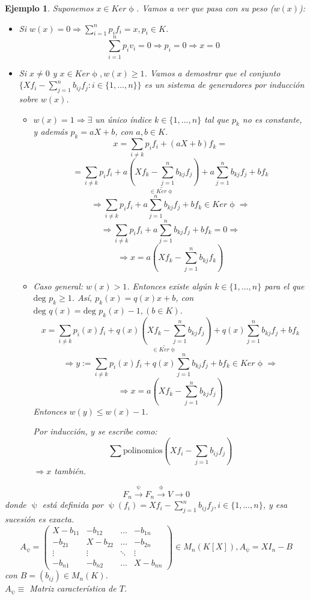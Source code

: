 \documentclass[11pt,a4paper]{article}
\theoremstyle{break}
\newtheorem{example}[theorem]{Ejemplo}
\begin{document}
\begin{example}
Suponemos $x \in Ker \upphi$. Vamos a ver que pasa con su peso ($w(x)$):
\begin{itemize}
\item Si $w(x) = 0 \Rightarrow \sum\limits_{i=1}^{n} p_{i} f_{i} = x, p_{i} \in K$.
$$\sum_{i=1}^{n} p_{i} v_{i} = 0 \Rightarrow p_{i} = 0 \Rightarrow x = 0$$
\item Si $x \neq 0$ y $x \in Ker \upphi, w(x) \geq 1$. Vamos a demostrar que el conjunto $\{Xf_{i} - \sum\limits_{j=1}^{n} b_{ij}f_{j}: i \in \{1, \dots, n\}\}$ es un sistema de generadores por inducción sobre $w(x)$.
\begin{itemize}
\item $w(x) = 1 \Rightarrow \exists$ un único índice $k \in \{1, \dots, n\}$ tal que $p_{k}$ no es constante, y además $p_{k} = aX + b$, con $a, b \in K$.
$$x = \sum_{i \neq k} p_{i} f_{i} + (aX + b)f_{k} = $$
$$= \sum_{i \neq k} p_{i}f_{i} + \underset{\in Ker \upphi}{\underline{a(X f_{k} - \sum_{j=1}^{n} b_{kj}f_{j})}} + a\sum_{j=1}^{n} b_{kj}f_{j} + bf_{k}$$
$$\Rightarrow \sum_{i \neq k} p_{i} f_{i} + a \sum_{j=1}^{n} b_{kj} f_{j} + bf_{k} \in Ker \upphi \Rightarrow$$
$$\Rightarrow \sum_{i \neq k} p_{i} f_{i} + a \sum_{j=1}^{n} b_{kj} f_{j} + bf_{k} = 0 \Rightarrow$$
$$\Rightarrow x = a(X f_{k} - \sum_{j=1}^{n} b_{kj}f_{k})$$
\item Caso general: $w(x) > 1$. Entonces existe algún $k \in \{1, \dots, n\}$ para el que $\text{deg } p_{k} \geq 1$. Así, $p_{k}(x) = q(x)x + b$, con $\text{deg } q(x) = \text{deg } p_{k}(x) - 1, (b \in K)$.
$$x = \sum_{i \neq k} p_{i}(x)f_{i} + \underset{\in Ker \upphi}{\underline{q(x) (Xf_{k} - \sum_{j=1}^{n} b_{kj} f_{j})}} + q(x) \sum_{j = 1}^{n} b_{kj} f_{j} + bf_{k}$$
$$\Rightarrow y := \sum_{i \neq k} p_{i}(x) f_{i} + q(x)\sum_{j=1}^{n} b_{kj}f_{j} + bf_{k} \in Ker \upphi \Rightarrow$$
$$\Rightarrow x = a(Xf_{k} - \sum_{j=1}^{n} b_{kj} f_{j})$$
Entonces $w(y) \leq w(x) - 1$.

Por inducción, $y$ se escribe como:
$$\sum \text{polinomios}(Xf_{i} - \sum_{j=1} b_{ij}f_{j})$$
$\Rightarrow x$ también.
\end{itemize}
\end{itemize}
$$F_{n} \overset{\uppsi}{\to} F_{n} \overset{\upphi}{\to} V \to 0$$
donde $\uppsi$ está definida por $\uppsi(f_{i}) = Xf_{i} - \sum_{j=1}^{n} b_{ij}f_{j}, i \in \{1, \dots, n\}$, y esa sucesión es exacta.
$$A_{\uppsi} =
\begin{pmatrix}
X-b_{11} & -b_{12} & \dots & -b_{1n} \\
-b_{21} & X-b_{22} & \dots & -b_{2n} \\
\vdots & \vdots & \ddots & \vdots \\
-b_{n1} & -b_{n2} & \dots & X-b_{nn}
\end{pmatrix}
\in M_{n}(K[X]), A_{\uppsi} = XI_{n} - B$$
con $B = (b_{ij}) \in M_{n}(K)$. \\
$A_{\uppsi} \equiv$ Matriz característica de $T$.
\end{example}
\end{document}
